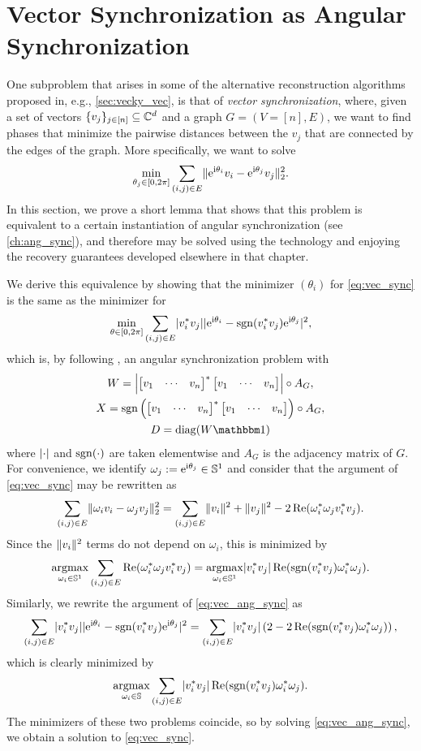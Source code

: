 \section{Vector Synchronization as Angular Synchronization}
One subproblem that arises in some of the alternative reconstruction algorithms proposed in, e.g., \cref{sec:vecky_vec}, is that of \emph{vector synchronization}, where, given a set of vectors $\{v_j\}_{j \in [n]} \subseteq \mathbb{C}^d$ and a graph $G = (V = [n], E)$, we want to find phases that minimize the pairwise distances between the $v_j$ that are connected by the edges of the graph.  More specifically, we want to solve \begin{equation} \min_{\theta_{j} \in [0, 2\pi]} \sum_{(i, j) \in E} \lVert\mathrm{e}^{\mathrm{i} \theta_{i}} v_i - \mathrm{e}^{\mathrm{i} \theta_{j}} v_j\rVert_2^2. \label{eq:vec_sync} \end{equation}  In this section, we prove a short lemma that shows that this problem is equivalent to a certain instantiation of angular synchronization (see \cref{ch:ang_sync}), and therefore may be solved using the technology and enjoying the recovery guarantees developed elsewhere in that chapter.

We derive this equivalence by showing that the minimizer $(\theta_i)$ for \eqref{eq:vec_sync} is the same as the minimizer for \begin{equation} \min_{\theta \in [0, 2\pi]} \sum_{(i, j) \in E} \lvert v_i^* v_j\rvert \lvert\mathrm{e}^{\mathrm{i} \theta_{i}} - \operatorname{sgn}(v_i^* v_j) \mathrm{e}^{\mathrm{i} \theta_{j}}\rvert^2, \label{eq:vec_ang_sync} \end{equation} which is, by following , an angular synchronization problem with \begin{equation} \begin{gathered} W = \abs*{\rowmat{v}{1}{n}^* \rowmat{v}{1}{n}} \circ A_G, \\ X = \sgn\left(\rowmat{v}{1}{n}^* \rowmat{v}{1}{n}\right) \circ A_G, \\ D = \diag(W \one)\end{gathered} \label{eq:vec_sync_mats}\end{equation} where $\lvert\cdot\rvert$ and $\operatorname{sgn}(\cdot)$ are taken elementwise and $A_G$ is the adjacency matrix of $G$.  For convenience, we identify $\omega_j := \mathrm{e}^{\mathrm{i} \theta_{j}} \in \mathbb{S}^1$ and consider that the argument of \eqref{eq:vec_sync} may be rewritten as \[\sum_{(i, j) \in E} \lVert\omega_i v_i - \omega_j v_j\rVert_2^2 = \sum_{(i, j) \in E} \lVert v_i\rVert^2 + \lVert v_j\rVert^2 - 2 \operatorname{Re}(\omega_i^* \omega_j v_i^* v_j).\]  Since the $\lVert v_i\rVert^2$ terms do not depend on $\omega_i$, this is minimized by \[\operatorname*{argmax}_{\omega_i \in \mathbb{S}^1} \sum_{(i, j) \in E} \operatorname{Re}(\omega_i^* \omega_j v_i^* v_j) = \operatorname*{argmax}_{\omega_i \in \mathbb{S}^1} \lvert v_i^* v_j\rvert \operatorname{Re}(\operatorname{sgn}(v_i^* v_j) \omega_i^* \omega_j).\]  Similarly, we rewrite the argument of \eqref{eq:vec_ang_sync} as \begin{equation} \sum_{(i, j) \in E} \lvert v_i^* v_j\rvert \lvert\mathrm{e}^{\mathrm{i} \theta_{i}} - \operatorname{sgn}(v_i^* v_j) \mathrm{e}^{\mathrm{i} \theta_{j}}\rvert^2 = \sum_{(i, j) \in E} \lvert v_i^* v_j\rvert \left(2 - 2 \operatorname{Re}(\operatorname{sgn}(v_i^* v_j) \omega_i^* \omega_j)\right),\label{eq:vec_as_re}\end{equation} which is clearly minimized by \[\operatorname*{argmax}_{\omega_i \in \mathbb{S}} \sum_{(i, j) \in E} \lvert v_i^* v_j\rvert \operatorname{Re}(\operatorname{sgn}(v_i^* v_j) \omega_i^* \omega_j).\]  The minimizers of these two problems coincide, so by solving \eqref{eq:vec_ang_sync}, we obtain a solution to \eqref{eq:vec_sync}.

